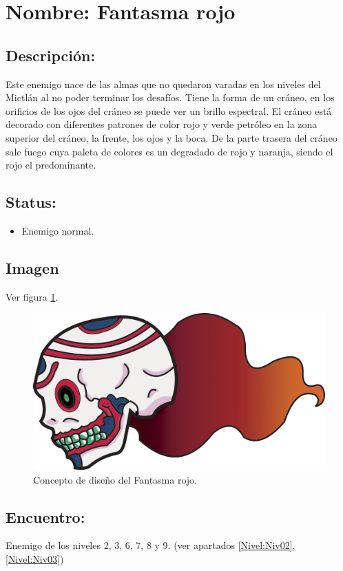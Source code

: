 \section{Nombre: Fantasma rojo}   \label{per:fantasmaR}
\subsection{Descripción:}
Este enemigo nace de las almas que no quedaron varadas en los niveles del Mictlán al no poder terminar los desafíos. Tiene la forma de un cráneo, en los orificios de los ojos del cráneo se puede ver un brillo espectral. El cráneo está decorado con diferentes patrones de color rojo y verde petróleo en la zona superior del cráneo, la frente, los ojos y la boca. De la parte trasera del cráneo sale fuego cuya paleta de colores es un degradado de rojo y naranja, siendo el rojo el predominante. 
\subsection{Status:}
\begin{itemize}
	\item Enemigo normal.
\end{itemize}
\subsection{Imagen}
Ver figura \ref{fig:fantasmaR}.
\begin{figure}
	\centering
	\includegraphics[height=0.2 \textheight]{Imagenes/fantasmaRojo}
	\caption{Concepto de diseño del Fantasma rojo.}
	\label{fig:fantasmaR}
\end{figure} 
\subsection{Encuentro:}
Enemigo de los niveles 2, 3, 6, 7, 8 y 9. (ver apartados \ref{Nivel:Niv02}, \ref{Nivel:Niv03})
